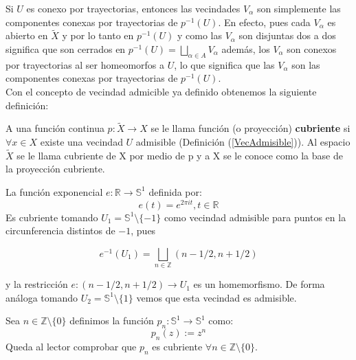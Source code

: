 Si $U$ es conexo por trayectorias, entonces las vecindades $V_{\alpha}$ son simplemente las componentes conexas por trayectorias de $p^{-1}(U)$. En efecto, pues cada $V_{\alpha}$ es abierto en $\widetilde{X}$ y por lo tanto en $p^{-1}(U)$ y como las $V_{\alpha}$ son disjuntas dos a dos significa que son cerrados en $p^{-1}(U)= \bigsqcup_{\alpha \in A} V_{\alpha}$ adem\'as, los $V_{\alpha}$ son conexos por trayectorias al ser homeomorfos a $U$, lo que significa que las $V_{\alpha}$ son las componentes conexas por trayectorias de $p^{-1}(U)$.\\

Con el concepto de vecindad admicible ya definido obtenemos la siguiente definici\'on:\\

\begin{definition}\label{proy cubr}
A una funci\'on continua $p: \widetilde{X} \rightarrow X$ se le llama funci\'on (o proyecci\'on) \textbf{cubriente} si $\forall x \in X$ existe una vecindad $U$ admisible (Definici\'on (\ref{VecAdmisible})). Al espacio $ \widetilde{X}$ se le llama cubriente de X por medio de p y a X se le conoce como la base de la proyecci\'on cubriente.\\
\end{definition}

 \begin{example}
La funci\'on exponencial 
$e:\mathbb R \rightarrow \mathbb S^{1}$ 
definida por:
 $$e(t)= e^{2 \pi i t}, t \in \mathbb R$$ 
Es cubriente  tomando $U_{1}=\mathbb S^{1} \setminus \lbrace -1 \rbrace $ 
como vecindad admisible para puntos en la circunferencia distintos de $-1$, pues 

$$e^{-1}(U_{1})= \bigsqcup_{n \in \mathbb Z}(n-1/2,n+1/2)$$ 

y la restricci\'on $e:(n-1/2,n+1/2) \rightarrow U_{1}$ 
es un homemorfismo. De forma an\'aloga tomando 
$U_{2}=\mathbb S^{1} \setminus \lbrace 1 \rbrace$ vemos que esta vecindad es admisible.\\
\end{example}

\begin{example}
Sea $n \in \mathbb{Z} \setminus \lbrace 0 \rbrace$ definimos la funci\'on $p_n:\mathbb S^{1} \rightarrow \mathbb S^{1}$ como:
$$p_n(z):=z^n$$
Queda al lector comprobar que $p_n$ es cubriente $\forall n \in \mathbb{Z} \setminus \lbrace 0 \rbrace$.\\
\end{example}

